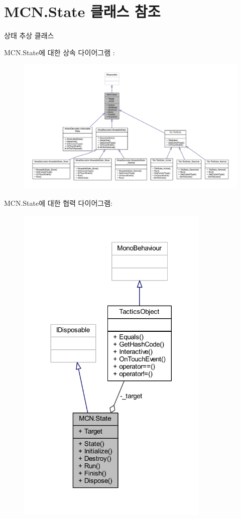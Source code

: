 \hypertarget{class_m_c_n_1_1_state}{}\section{M\+C\+N.\+State 클래스 참조}
\label{class_m_c_n_1_1_state}


상태 추상 클래스  




M\+C\+N.\+State에 대한 상속 다이어그램 \+: 
\nopagebreak
\begin{figure}[H]
\begin{center}
\leavevmode
\includegraphics[width=350pt]{class_m_c_n_1_1_state__inherit__graph}
\end{center}
\end{figure}


M\+C\+N.\+State에 대한 협력 다이어그램\+:\nopagebreak
\begin{figure}[H]
\begin{center}
\leavevmode
\includegraphics[width=260pt]{class_m_c_n_1_1_state__coll__graph}
\end{center}
\end{figure}
